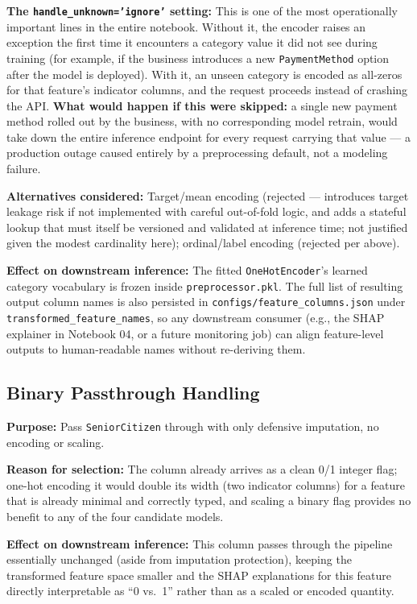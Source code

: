 \documentclass[11pt]{article}
\newcommand{\artifact}[1]{\texttt{\color{navy}#1}}
\begin{document}
\textbf{The \texttt{handle\_unknown='ignore'} setting:} This is one of the most operationally important lines in the entire notebook. Without it, the encoder raises an exception the first time it encounters a category value it did not see during training (for example, if the business introduces a new \artifact{PaymentMethod} option after the model is deployed). With it, an unseen category is encoded as all-zeros for that feature's indicator columns, and the request proceeds instead of crashing the API. \textbf{What would happen if this were skipped:} a single new payment method rolled out by the business, with no corresponding model retrain, would take down the entire inference endpoint for every request carrying that value --- a production outage caused entirely by a preprocessing default, not a modeling failure.

\textbf{Alternatives considered:} Target/mean encoding (rejected --- introduces target leakage risk if not implemented with careful out-of-fold logic, and adds a stateful lookup that must itself be versioned and validated at inference time; not justified given the modest cardinality here); ordinal/label encoding (rejected per above).

\textbf{Effect on downstream inference:} The fitted \texttt{OneHotEncoder}'s learned category vocabulary is frozen inside \artifact{preprocessor.pkl}. The full list of resulting output column names is also persisted in \artifact{configs/feature\_columns.json} under \texttt{transformed\_feature\_names}, so any downstream consumer (e.g., the SHAP explainer in Notebook 04, or a future monitoring job) can align feature-level outputs to human-readable names without re-deriving them.

\subsection{Binary Passthrough Handling}

\textbf{Purpose:} Pass \artifact{SeniorCitizen} through with only defensive imputation, no encoding or scaling.

\textbf{Reason for selection:} The column already arrives as a clean 0/1 integer flag; one-hot encoding it would double its width (two indicator columns) for a feature that is already minimal and correctly typed, and scaling a binary flag provides no benefit to any of the four candidate models.

\textbf{Effect on downstream inference:} This column passes through the pipeline essentially unchanged (aside from imputation protection), keeping the transformed feature space smaller and the SHAP explanations for this feature directly interpretable as ``0 vs.\ 1'' rather than as a scaled or encoded quantity.
\end{document}
